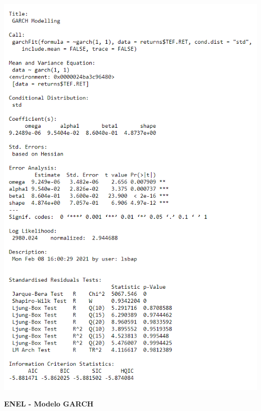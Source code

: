 \documentclass[
  12pt,
  a4paper,
  openany]{book}
\theoremstyle{definition}
\theoremstyle{definition}
\theoremstyle{definition}
\theoremstyle{remark}
\begin{document}
\begin{center}
\begin{minipage}{0.90\linewidth}
    \centering
    \includegraphics[width=2\textwidth]{image/garchtef.png}
\end{minipage}
\end{center}

\newpage

\begin{center}
 {\normalfont\Large\bfseries ENEL - Modelo GARCH}
\end{center}
\end{document}
